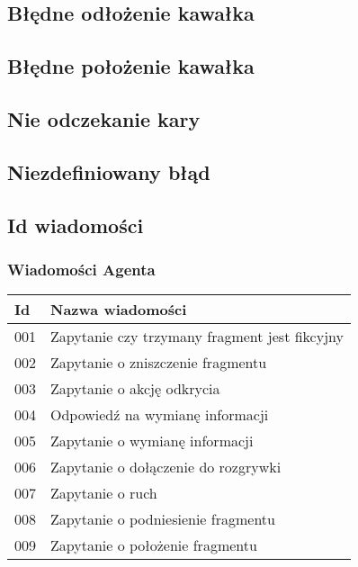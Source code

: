 \documentclass[Dokumentacja.tex]{subfiles}
\begin{document}
\subsection{Błędne odłożenie kawałka}


\subsection{Błędne położenie kawałka}


\subsection{Nie odczekanie kary}


\subsection{Niezdefiniowany błąd}


\subsection{Id wiadomości}

\subsubsection{Wiadomości Agenta}
\begin{tabular}{ |p{1cm}|p{12cm}| }
 \hline
 Id & Nazwa wiadomości \\
 \hline
 001 & Zapytanie czy trzymany fragment jest fikcyjny \\
 002 & Zapytanie o zniszczenie fragmentu \\
 003 & Zapytanie o akcję odkrycia \\
 004 & Odpowiedź na wymianę informacji \\
 005 & Zapytanie o wymianę informacji \\
 006 & Zapytanie o dołączenie do rozgrywki \\
 007 & Zapytanie o ruch \\
 008 & Zapytanie o podniesienie fragmentu \\
 009 & Zapytanie o położenie fragmentu \\
 \hline
\end{tabular}
\end{document}
